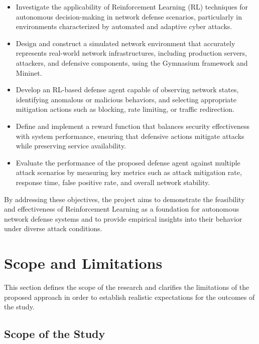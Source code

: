 \documentclass[12pt,a4paper]{report}
\begin{document}
\begin{itemize}
    \item Investigate the applicability of Reinforcement Learning (RL) techniques for autonomous decision-making in network defense scenarios, particularly in environments characterized by automated and adaptive cyber attacks.
    
    \item Design and construct a simulated network environment that accurately represents real-world network infrastructures, including production servers, attackers, and defensive components, using the Gymnasium framework and Mininet.
    
    \item Develop an RL-based defense agent capable of observing network states, identifying anomalous or malicious behaviors, and selecting appropriate mitigation actions such as blocking, rate limiting, or traffic redirection.
    
    \item Define and implement a reward function that balances security effectiveness with system performance, ensuring that defensive actions mitigate attacks while preserving service availability.
    
    \item Evaluate the performance of the proposed defense agent against multiple attack scenarios by measuring key metrics such as attack mitigation rate, response time, false positive rate, and overall network stability.
\end{itemize}

By addressing these objectives, the project aims to demonstrate the feasibility and effectiveness of Reinforcement Learning as a foundation for autonomous network defense systems and to provide empirical insights into their behavior under diverse attack conditions.

\section{Scope and Limitations}

This section defines the scope of the research and clarifies the limitations of the proposed approach in order to establish realistic expectations for the outcomes of the study.

\subsection{Scope of the Study}
\end{document}
